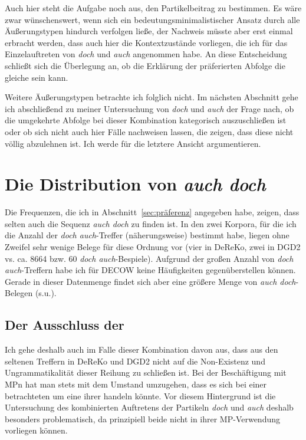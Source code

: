 Auch hier steht die Aufgabe noch aus, den Partikelbeitrag zu bestimmen. Es wäre zwar wünschenswert, wenn sich ein bedeutungsminimalistischer Ansatz  durch alle Äußerungstypen hindurch verfolgen ließe, der Nachweis müsste aber erst einmal erbracht werden, dass auch hier die Kontextzustände vorliegen, die ich für das Einzelauftreten von \textit{doch} und \textit{auch} angenommen habe. An diese Entscheidung schließt sich die Überlegung an, ob die Erklärung der präferierten Abfolge die gleiche sein kann. 	

Weitere Äußerungstypen betrachte ich folglich nicht. Im nächsten Abschnitt gehe ich abschließend zu meiner Untersuchung von \textit{doch} und \textit{auch} der Frage nach, ob die umgekehrte Abfolge bei dieser Kombination kategorisch auszuschlie\-ßen ist oder ob sich nicht auch hier Fälle nachweisen lassen, die zeigen, dass diese nicht völlig abzulehnen ist. Ich werde für die letztere Ansicht argumentieren.

\section{Die Distribution von \textit{auch doch}}
\label{sec:distributionad}
Die Frequenzen, die ich in Abschnitt~\ref{sec:präferenz} angegeben habe, zeigen, dass selten auch die Sequenz \textit{auch doch} zu finden ist. In den zwei Korpora, für die ich die Anzahl der \textit{doch auch}-Treffer (näherungsweise) bestimmt habe, liegen ohne Zweifel sehr wenige Belege für diese Ordnung vor (vier in DeReKo, zwei in DGD2 vs. ca. 8664 bzw. 60 \textit{doch auch}-Bespiele). Aufgrund der großen Anzahl von \textit{doch auch}-Treffern habe ich für DECOW keine Häufigkeiten gegenüberstellen können. Gerade in dieser Datenmenge findet sich aber eine größere Menge von \textit{auch doch}-Belegen (s.u.).

\subsection{Der Ausschluss der }
Ich gehe deshalb auch im Falle dieser Kombination davon aus, dass aus den seltenen Treffern in DeReKo und DGD2 nicht auf die Non-Existenz und Ungrammatikalität dieser Reihung zu schließen ist. Bei der Beschäftigung mit MPn hat man stets mit dem Umstand umzugehen, dass es sich bei einer betrachteten  um eine ihrer   handeln könnte. Vor diesem Hintergrund ist die Untersuchung des kombinierten Auftretens der Partikeln \textit{doch} und \textit{auch} deshalb besonders problematisch, da prinzipiell beide nicht in ihrer MP-Verwendung vorliegen können.

